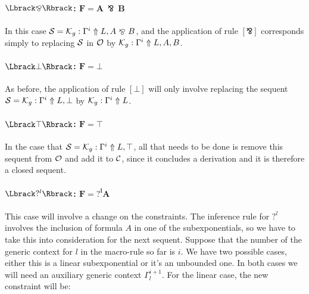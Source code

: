 \paragraph{$\alg{\bindnasrepma}$: $\mathbf{F = A\ \bindnasrepma\ B}$\\}
In this case $\mathcal{S} = \mathcal{K}_{g} : \Gamma^i \Uparrow L, A\ \bindnasrepma\ B$, and
the application of rule $[\bindnasrepma]$ corresponds simply to replacing
$\mathcal{S}$ in $\mathcal{O}$ by $\mathcal{K}_{g} : \Gamma^i \Uparrow L, A, B$.

\paragraph{$\alg{\bot}$: $\mathbf{F = \bot}$\\}
As before, the application of rule $[\bot]$ will only involve replacing the
sequent $\mathcal{S} = \mathcal{K}_{g} : \Gamma^i \Uparrow L, \bot$ by $\mathcal{K}_{g} : \Gamma^i
\Uparrow L$.

\begin{comment}
\paragraph{$\mathbf{F = \forall x. A}$\\}
Again, the application of rule $[\forall]$ will correspond with the sustitution
of the sequent $\Sscr = \genK : \Gamma^i \Uparrow L, \forall x. A$ in
$\Oscr$ with $\genK : \Gamma^i \Uparrow L, A\{c/x\}$, where $c$ is a fresh
variable.
\end{comment}

\paragraph{$\alg{\top}$: $\mathbf{F = \top}$\\}
In the case that $\mathcal{S} = \mathcal{K}_{g} : \Gamma^i \Uparrow L, \top$, all that needs
to be done is remove this sequent from $\mathcal{O}$ and add it to $\mathcal{C}$, since it
concludes a derivation and it is therefore a closed sequent.

\paragraph{$\alg{?^l}$: $\mathbf{F = ?^l A}$\\}
This case will involve a change on the constraints. The inference rule for $?^l$
involves the inclusion of formula $A$ in one of the subexponentials, so we have
to take this into consideration for the next sequent. Suppose that the number of
the generic context for $l$ in the macro-rule so far is $i$. We have two possible cases,
either this is a linear subexponential or it's an unbounded one. In both cases
we will need an auxiliary generic context $\Gamma_l^{i+1}$. For the linear case,
the new constraint will be:


